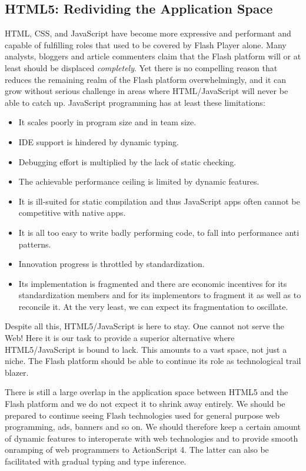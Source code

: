 \subsection{HTML5: Redividing the Application Space}
HTML, CSS, and JavaScript have become more expressive and performant and capable
of fulfilling roles that used to be covered by Flash Player alone. Many
analysts, bloggers and article commenters claim that the Flash platform will or
at least should be displaced {\em completely}. Yet
there is no compelling  reason that reduces the remaining realm of the Flash platform
overwhelmingly, and it can grow without serious challenge in areas where
HTML/JavaScript will never be able to catch up. 
JavaScript programming has at least these limitations:
\begin{itemize}
  \item It scales poorly in program size and in team size.
  \item IDE support is hindered by dynamic typing.
  \item Debugging effort is multiplied by the lack of static checking.
  \item The achievable performance ceiling is limited by dynamic features.
  \item It is ill-suited for static compilation and thus JavaScript apps
  often cannot be competitive with native apps.
  \item It is all too easy to write badly performing code, to fall into
  performance anti patterns.
  \item Innovation progress is throttled by standardization.
  \item Its implementation is fragmented and there are economic incentives for
  its standardization members and for its implementors to fragment it as well
  as to reconcile it. At the very least, we can expect its fragmentation to
  oscillate.
\end{itemize}
Despite all this, HTML5/JavaScript is here to stay. One cannot not serve the
Web! Here it is our task to provide a superior alternative where HTML5/JavaScript is
bound to lack. This amounts to a vast space, not just a niche.
The Flash platform should be able to continue its role as technological trail
blazer.

There is still a large overlap in the application space between HTML5
and the Flash platform and we do not expect it to shrink away entirely. We
should be prepared to continue seeing Flash technologies used for general
purpose web programming, ads, banners and so on. We should therefore keep a certain amount of dynamic features to
interoperate with web technologies and to provide smooth onramping of web programmers to
ActionScript 4. The latter can also be facilitated with gradual
typing and type inference.

